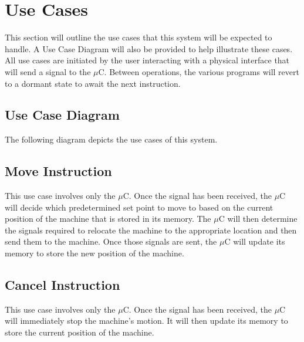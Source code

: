 \documentclass[titlepage]{article}
\begin{document}
\section{Use Cases}
This section will outline the use cases that this system will be expected to handle. A Use Case Diagram will also be provided to help illustrate these cases. All use cases are initiated by the user interacting with a physical interface that will send a signal to the $\mu$C. Between operations, the various programs will revert to a dormant state to await the next instruction.
\subsection{Use Case Diagram}
The following diagram depicts the use cases of this system.
\subsection{Move Instruction}
This use case involves only the $\mu$C. Once the signal has been received, the $\mu$C will decide which predetermined set point to move to based on the current position of the machine that is stored in its memory. The $\mu$C will then determine the signals required to relocate the machine to the appropriate location and then send them to the machine. Once those signals are sent, the $\mu$C will update its memory to store the new position of the machine.
\subsection{Cancel Instruction}
This use case involves only the $\mu$C. Once the signal has been received, the $\mu$C will immediately stop the machine's motion. It will then update its memory to store the current position of the machine.
\end{document}
